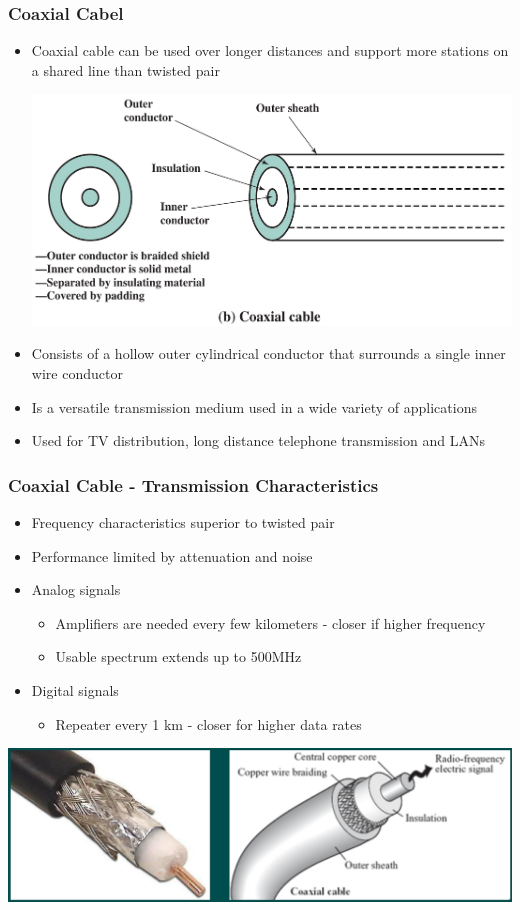 \documentclass[pdflatex,compress]{beamer}
\begin{document}
\begin{frame}
	\frametitle{Coaxial Cabel}
	\begin{itemize}
		\item Coaxial cable can be used over longer distances and support more stations on a shared line than twisted pair
		\begin{center}
			\includegraphics[width=0.5\linewidth]{img/img04}
		\end{center}
		\item Consists of a hollow outer cylindrical conductor that surrounds a single inner wire conductor
		\item Is a versatile transmission medium used in a wide variety of applications
		\item Used for TV distribution, long distance telephone transmission and LANs
	\end{itemize}
\end{frame}

\begin{frame}
	\frametitle{Coaxial Cable - Transmission Characteristics}
	\begin{itemize}
		\item Frequency characteristics superior to twisted pair
		\item Performance limited by attenuation and noise
		\item Analog signals
		\begin{itemize}
			\item  Amplifiers are needed every few kilometers - closer if higher frequency
			\item Usable spectrum extends up to 500MHz
		\end{itemize}
		\item Digital signals
		\begin{itemize}
			\item Repeater every 1 km - closer for higher data rates
		\end{itemize}
	\end{itemize}
	\begin{center}
		\includegraphics[width=0.7\linewidth]{img/img11}
	\end{center}
\end{frame}
\end{document}
